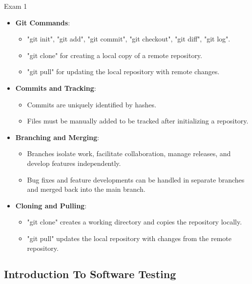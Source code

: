 \begin{examnotes}{Exam 1}
\begin{highlight}
        \begin{itemize}
            \item \textbf{Git Commands}:
                \begin{itemize}
                    \item "git init", "git add", "git commit", "git checkout", "git diff", "git log".
                    \item "git clone" for creating a local copy of a remote repository.
                    \item "git pull" for updating the local repository with remote changes.
                \end{itemize}
            \item \textbf{Commits and Tracking}:
                \begin{itemize}
                    \item Commits are uniquely identified by hashes.
                    \item Files must be manually added to be tracked after initializing a repository.
                \end{itemize}
            \item \textbf{Branching and Merging}:
                \begin{itemize}
                    \item Branches isolate work, facilitate collaboration, manage releases, and develop features independently.
                    \item Bug fixes and feature developments can be handled in separate branches and merged back into the main branch.
                \end{itemize}
            \item \textbf{Cloning and Pulling}:
                \begin{itemize}
                    \item "git clone" creates a working directory and copies the repository locally.
                    \item "git pull" updates the local repository with changes from the remote repository.
                \end{itemize}
        \end{itemize}
    \end{highlight}
    
    \subsection*{Introduction To Software Testing}
    

\end{examnotes}
